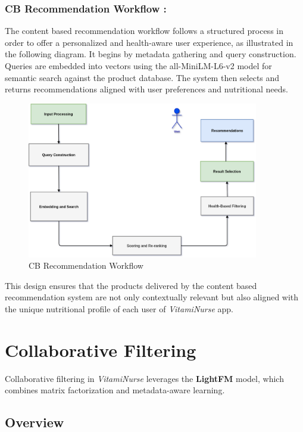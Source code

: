 \subsubsection{CB Recommendation Workflow :}
The content based recommendation workflow follows a structured process in order to offer a personalized and health-aware user experience, as illustrated in the following diagram. It begins by metadata gathering and query construction. Queries are embedded into vectors using the all-MiniLM-L6-v2 model for semantic search against the product database. The system then selects and returns recommendations aligned with user preferences and nutritional needs.

\begin{center}
    \begin{figure}[H]
        \includegraphics[width=0.9\textwidth]{images/CB_recommendation_workflow_simple.png}
    \caption{CB Recommendation Workflow} 
    \label{fig:cb_workflow}
\end{figure}
\end{center}

This design ensures that the products delivered by the content based recommendation system are not only contextually relevant but also aligned with the unique nutritional profile of each user of \textit{VitamiNurse} app.

\newpage
\section{Collaborative Filtering}
Collaborative filtering in \textit{VitamiNurse} leverages the \textbf{LightFM} model, which combines matrix factorization and metadata-aware learning. 
\subsection{Overview}

